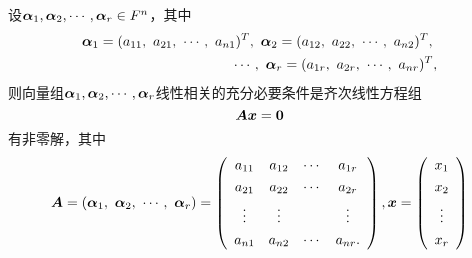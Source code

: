 \begin{frame}
\begin{dingli}
  设$\boldsymbol{\alpha}_1,\boldsymbol{\alpha}_2,\cdots,\boldsymbol{\alpha}_r\in F^n$，其中
  $$
  \begin{aligned}
    \boldsymbol{\alpha}_1 = (a_{11},~a_{21},~\cdots,~a_{n1})^T,~
    \boldsymbol{\alpha}_2 = (a_{12},~a_{22},~\cdots,~a_{n2})^T,~\\
    \cdots,~
    \boldsymbol{\alpha}_r = (a_{1r},~a_{2r},~\cdots,~a_{nr})^T,
  \end{aligned}
  $$
  则向量组$\boldsymbol{\alpha}_1,\boldsymbol{\alpha}_2,\cdots,\boldsymbol{\alpha}_r$线性相关的充分必要条件是齐次线性方程组
  \begin{equation}\label{ax}
    \MA \vx = \M0
  \end{equation}
  有非零解，其中
  $$
  \boldsymbol{A} = (\boldsymbol{\alpha}_1,~\boldsymbol{\alpha}_2,~\cdots,~\boldsymbol{\alpha}_r) = \left(
    \begin{array}{cccc}
      a_{11}&a_{12}&\cdots&a_{1r}\\[0.05in]
      a_{21}&a_{22}&\cdots&a_{2r}\\[0.05in]
      \vdots&\vdots&&\vdots\\[0.05in]
      a_{n1}&a_{n2}&\cdots&a_{nr}.
    \end{array}\right), {\boldsymbol{x}} = \left(
    \begin{array}{c}
      x_1\\[0.05in]
      x_2\\[0.05in]
      \vdots\\[0.05in]
      x_r
    \end{array}
  \right)
  $$
\end{dingli}
\end{frame}  

